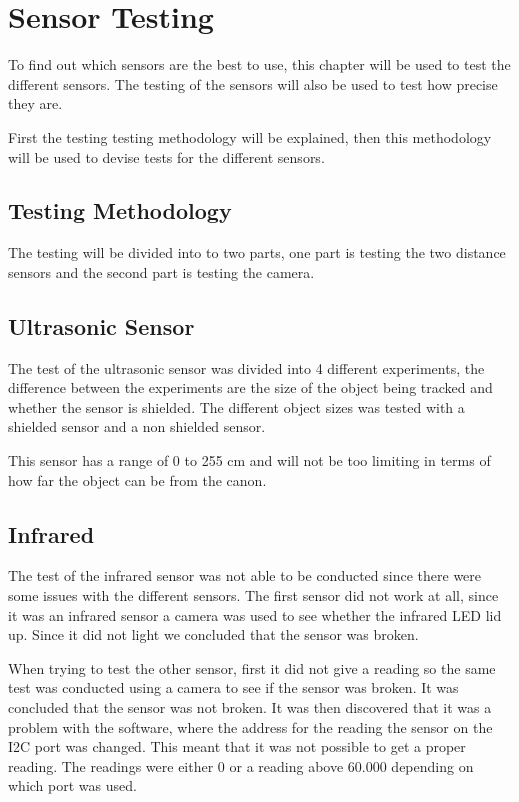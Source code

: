 \section{Sensor Testing}
To find out which sensors are the best to use, this chapter will be used to test
the different sensors. The testing of the sensors will also be used to test how
precise they are.\nl

First the testing testing methodology will be explained, then this methodology
will be used to devise tests for the different sensors. 

\subsection{Testing Methodology}
The testing will be divided into to two parts, one part is testing the two
distance sensors and the second part is testing the camera. 

\subsection{Ultrasonic Sensor}
The test of the ultrasonic sensor was divided into 4 different experiments, the
difference between the experiments are the size of the object being tracked and
whether the sensor is shielded. The different object sizes was tested with a
shielded sensor and a non shielded sensor. \nl


This sensor has a range of 0 to 255 cm and will not be too limiting in terms of
how far the object can be from the canon. 

\subsection{Infrared}
The test of the infrared sensor was not able to be conducted since there were
some issues with the different sensors. The first sensor did not work at all,
since it was an infrared sensor a camera was used to see whether the infrared
LED lid up. Since it did not light we concluded that the sensor was broken. \nl

When trying to test the other sensor, first it did not give a reading so the
same test was conducted using a camera to see if the sensor was broken. It was
concluded that the sensor was not broken. It was then discovered that it was a
problem with the software, where the address for the reading the sensor on the
I2C port was changed. This meant that it was not possible to get a proper
reading. The readings were either 0 or a reading above 60.000 depending on which
port was used. \nl

